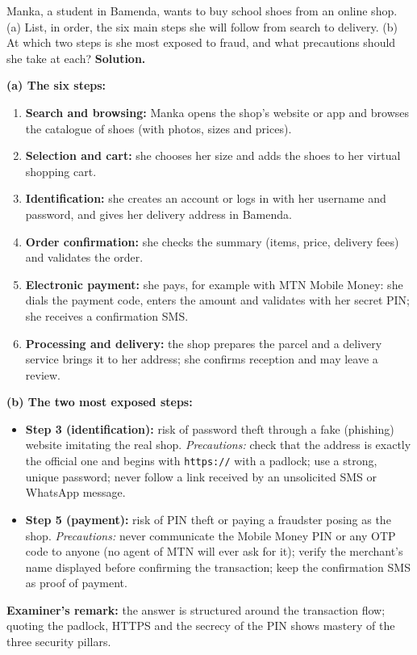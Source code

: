 \documentclass[11pt]{article}
\begin{document}
\begin{exoresolu}
Manka, a student in Bamenda, wants to buy school shoes from an online shop. (a) List, in order, the six main steps she will follow from search to delivery. (b) At which two steps is she most exposed to fraud, and what precautions should she take at each?
\tcblower
\textbf{Solution.}

\textbf{(a) The six steps:}
\begin{enumerate}
\item \textbf{Search and browsing:} Manka opens the shop's website or app and browses the catalogue of shoes (with photos, sizes and prices).
\item \textbf{Selection and cart:} she chooses her size and adds the shoes to her virtual shopping cart.
\item \textbf{Identification:} she creates an account or logs in with her username and password, and gives her delivery address in Bamenda.
\item \textbf{Order confirmation:} she checks the summary (items, price, delivery fees) and validates the order.
\item \textbf{Electronic payment:} she pays, for example with MTN Mobile Money: she dials the payment code, enters the amount and validates with her secret PIN; she receives a confirmation SMS.
\item \textbf{Processing and delivery:} the shop prepares the parcel and a delivery service brings it to her address; she confirms reception and may leave a review.
\end{enumerate}

\textbf{(b) The two most exposed steps:}
\begin{itemize}
\item \textbf{Step 3 (identification):} risk of password theft through a fake (phishing) website imitating the real shop. \emph{Precautions:} check that the address is exactly the official one and begins with \texttt{https://} with a padlock; use a strong, unique password; never follow a link received by an unsolicited SMS or WhatsApp message.
\item \textbf{Step 5 (payment):} risk of PIN theft or paying a fraudster posing as the shop. \emph{Precautions:} never communicate the Mobile Money PIN or any OTP code to anyone (no agent of MTN will ever ask for it); verify the merchant's name displayed before confirming the transaction; keep the confirmation SMS as proof of payment.
\end{itemize}
\textbf{Examiner's remark:} the answer is structured around the transaction flow; quoting the padlock, HTTPS and the secrecy of the PIN shows mastery of the three security pillars.
\end{exoresolu}
\end{document}
